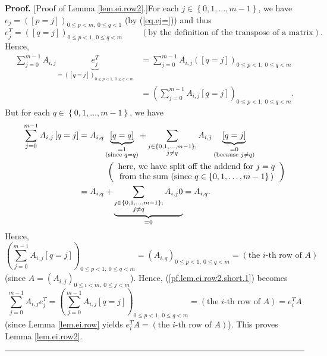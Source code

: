 \documentclass[numbers=enddot,12pt,final,onecolumn,notitlepage]{scrartcl}%
\theoremstyle{definition}
\newenvironment{proof}[1][Proof]{\noindent\textbf{#1.} }{\ \rule{0.5em}{0.5em}}
\let\sumnonlimits\sum
\renewcommand{\sum}{\sumnonlimits\limits}
\newenvironment{vershort}{}{}
\begin{document}
\begin{vershort}
\begin{proof}
[Proof of Lemma \ref{lem.ei.row2}.]For each $j\in\left\{  0,1,\ldots
,m-1\right\}  $, we have $e_{j}=\left(  \left[  p=j\right]  \right)  _{0\leq
p<m,\ 0\leq q<1}$ (by (\ref{eq.ej=})) and thus
\[
e_{j}^{T}=\left(  \left[  q=j\right]  \right)  _{0\leq p<1,\ 0\leq
q<m}\ \ \ \ \ \ \ \ \ \ \left(  \text{by the definition of the transpose of a
matrix}\right)  .
\]
Hence,%
\begin{align}
\sum_{j=0}^{m-1}A_{i,j}\underbrace{e_{j}^{T}}_{=\left(  \left[  q=j\right]
\right)  _{0\leq p<1,\ 0\leq q<m}}  &  =\sum_{j=0}^{m-1}A_{i,j}\left(  \left[
q=j\right]  \right)  _{0\leq p<1,\ 0\leq q<m}\nonumber\\
&  =\left(  \sum_{j=0}^{m-1}A_{i,j}\left[  q=j\right]  \right)  _{0\leq
p<1,\ 0\leq q<m}. \label{pf.lem.ei.row2.short.1}%
\end{align}
But for each $q\in\left\{  0,1,\ldots,m-1\right\}  $, we have%
\begin{align*}
\sum_{j=0}^{m-1}A_{i,j}\left[  q=j\right]   &  =A_{i,q}\underbrace{\left[
q=q\right]  }_{\substack{=1\\\text{(since }q=q\text{)}}}+\sum_{\substack{j\in
\left\{  0,1,\ldots,m-1\right\}  ;\\j\neq q}}A_{i,j}\underbrace{\left[
q=j\right]  }_{\substack{=0\\\text{(because }j\neq q\text{)}}}\\
&  \ \ \ \ \ \ \ \ \ \ \left(
\begin{array}
[c]{c}%
\text{here, we have split off the addend for }j=q\\
\text{from the sum (since }q\in\left\{  0,1,\ldots,m-1\right\}  \text{)}%
\end{array}
\right) \\
&  =A_{i,q}+\underbrace{\sum_{\substack{j\in\left\{  0,1,\ldots,m-1\right\}
;\\j\neq q}}A_{i,j}0}_{=0}=A_{i,q}.
\end{align*}
Hence,
\[
\left(  \sum_{j=0}^{m-1}A_{i,j}\left[  q=j\right]  \right)  _{0\leq
p<1,\ 0\leq q<m}=\left(  A_{i,q}\right)  _{0\leq p<1,\ 0\leq q<m}=\left(
\text{the }i\text{-th row of }A\right)
\]
(since $A=\left(  A_{i,j}\right)  _{0\leq i<m,\ 0\leq j<m}$). Hence,
(\ref{pf.lem.ei.row2.short.1}) becomes%
\[
\sum_{j=0}^{m-1}A_{i,j}e_{j}^{T}=\left(  \sum_{j=0}^{m-1}A_{i,j}\left[
q=j\right]  \right)  _{0\leq p<1,\ 0\leq q<m}=\left(  \text{the }i\text{-th
row of }A\right)  =e_{i}^{T}A
\]
(since Lemma \ref{lem.ei.row} yields $e_{i}^{T}A=\left(  \text{the }i\text{-th
row of }A\right)  $). This proves Lemma \ref{lem.ei.row2}.
\end{proof}
\end{vershort}
\end{document}
